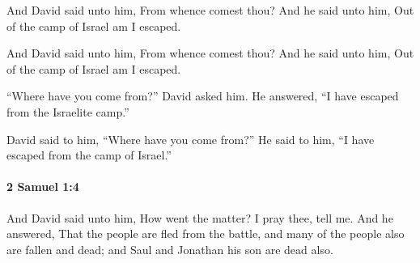 			And David said unto him, From whence comest thou? And he said unto him, Out of the camp of Israel am I escaped.

			\begin{versebox}
					\item[BHS] 
					\item[ASV] And David said unto him, From whence comest thou? And he said unto him, Out of the camp of Israel am I escaped.
					\item[NIV] “Where have you come from?” David asked him. He answered, “I have escaped from the Israelite camp.”
					\item[NRSV] David said to him, “Where have you come from?” He said to him, “I have escaped from the camp of Israel.”
			\end{versebox}

		\paragraph{2 Samuel 1:4} %
			\label{2SAMUEL-1-4}

			And David said unto him, How went the matter? I pray thee, tell me. And he answered, That the people are fled from the battle, and many of the people also are fallen and dead; and Saul and Jonathan his son are dead also.

